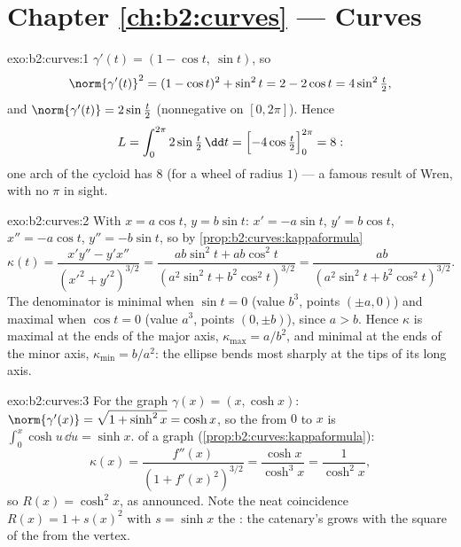 \section*{Chapter \ref{ch:b2:curves} --- Curves}

\begin{solution}{exo:b2:curves:1}
$\gamma'(t) = (1 - \cos t,\ \sin t)$, so
\[
\norm{\gamma'(t)}^2 = (1 - \cos t)^2 + \sin^2 t
= 2 - 2\cos t = 4\sin^2\tfrac t2 ,
\]
and $\norm{\gamma'(t)} = 2\sin\frac t2$ (nonnegative on $[0,
2\pi]$). Hence
\[
L = \int_0^{2\pi} 2\sin\tfrac t2\,\dd t
= \Bigl[-4\cos\tfrac t2\Bigr]_0^{2\pi} = 8 :
\]
one arch of the cycloid has  $8$ (for a wheel of radius
$1$) --- a famous result of Wren, with no $\pi$ in sight.
\end{solution}

\begin{solution}{exo:b2:curves:2}
With $x = a\cos t$, $y = b\sin t$: $x' = -a\sin t$, $y' = b\cos
t$, $x'' = -a\cos t$, $y'' = -b\sin t$, so by
\cref{prop:b2:curves:kappaformula}
\[
\kappa(t)
= \frac{x'y'' - y'x''}{(x'^2 + y'^2)^{3/2}}
= \frac{ab\sin^2 t + ab\cos^2 t}
       {(a^2\sin^2 t + b^2\cos^2 t)^{3/2}}
= \frac{ab}{(a^2\sin^2 t + b^2\cos^2 t)^{3/2}} .
\]
The denominator is minimal when $\sin t = 0$ (value $b^3$, points
$(\pm a, 0)$) and maximal when $\cos t = 0$ (value $a^3$, points
$(0, \pm b)$), since $a > b$. Hence $\kappa$ is maximal at the
ends of the major axis, $\kappa_{\max} = a/b^2$, and minimal at
the ends of the minor axis, $\kappa_{\min} = b/a^2$: the ellipse
bends most sharply at the tips of its long axis.
\end{solution}

\begin{solution}{exo:b2:curves:3}
For the graph $\gamma(x) = (x, \cosh x)$: $\norm{\gamma'(x)} =
\sqrt{1 + \sinh^2 x} = \cosh x$, so the  from $0$ to $x$
is $\int_0^x \cosh u\,\dd u = \sinh x$.  of a graph
(\cref{prop:b2:curves:kappaformula}):
\[
\kappa(x) = \frac{f''(x)}{(1 + f'(x)^2)^{3/2}}
= \frac{\cosh x}{\cosh^3 x} = \frac{1}{\cosh^2 x} ,
\]
so $R(x) = \cosh^2 x$, as announced. Note the neat coincidence
$R(x) = 1 + s(x)^2$ with $s = \sinh x$ the : the
catenary's  grows with the square of the  from the vertex.
\end{solution}

